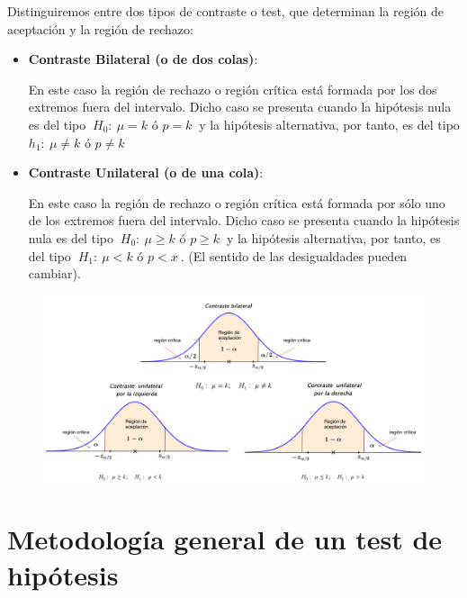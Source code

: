 \begin{definition}

Distinguiremos entre dos tipos de contraste o test, que determinan la región de aceptación y la región de rechazo:

\begin{itemize}
\item \textbf{Contraste Bilateral (o de dos colas)}:

En este caso la región de rechazo o región crítica está formada por los dos extremos fuera del intervalo. Dicho caso se presenta cuando la hipótesis nula es del tipo $\ H_0 : \ \mu=k \text{ ó } p=k \ $ y la hipótesis alternativa, por tanto, es del tipo $h_1:\ \mu \neq k \text{ ó }  p\neq k$

\item \textbf{Contraste Unilateral (o de una cola)}:

En este caso la región de rechazo o región crítica está formada por sólo uno de los extremos fuera del intervalo. Dicho caso se presenta cuando la hipótesis nula es del tipo $\ H_0:\ \mu \ge k \text{ ó } p\ge k  \ $ y la hipótesis alternativa, por tanto, es del tipo $\ H_1:\ \mu<k \text{ ó } p<x \ $. (El sentido de las desigualdades pueden cambiar).	
\end{itemize}
	
\end{definition}


\begin{figure}[H]
	\centering
	\includegraphics[width=1\textwidth]{imagenes/imagenes06/T06IM05.png}
	\end{figure}
	
	
\section{Metodología general de un test de hipótesis}	
	
	
	
